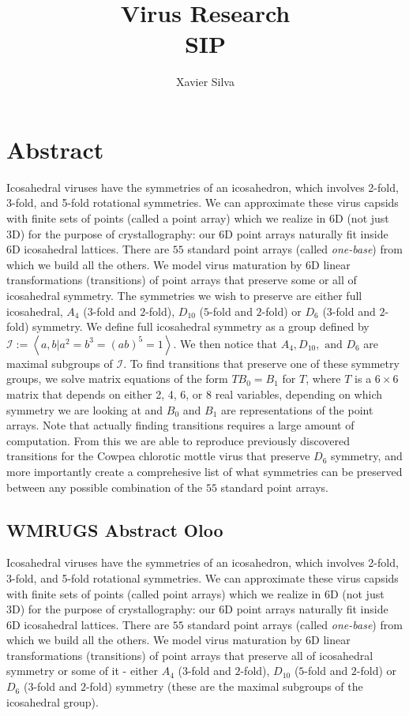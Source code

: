 \documentclass[a4paper,10pt]{article}
\title{Virus Research \\ \large SIP}
\author{Xavier Silva}
\theoremstyle{plain}
\theoremstyle{definition}
\theoremstyle{remark}
\newcommand{\generatedby}[1]{\left\langle#1\right\rangle}
\begin{document}
\maketitle

\tableofcontents


\section{Abstract}

Icosahedral viruses have the symmetries of an icosahedron, which involves 2-fold, 3-fold, and 5-fold rotational symmetries.
We can approximate these virus capsids with finite sets of points (called a point array) which we realize in 6D (not just 3D) for the purpose of crystallography: our 6D point arrays naturally fit inside 6D icosahedral lattices. There are \(55\) standard point arrays (called \emph{one-base}) from which we build all the others.
We model virus maturation by 6D linear transformations (transitions) of point arrays that preserve some or all of icosahedral symmetry.
The symmetries we wish to preserve are either full icosahedral, $A_4$ ($3$-fold and $2$-fold), $D_{10}$ ($5$-fold and $2$-fold) or $D_6$ ($3$-fold and $2$-fold) symmetry.
We define full icosahedral symmetry as a group defined by \(\mathcal{I} := \generatedby{a, b | a^2 = b^3 = (ab)^5 = 1}\).
We then notice that \(A_4, D_{10}, \text{ and } D_6\) are maximal subgroups of \(\mathcal{I}\).
To find transitions that preserve one of these symmetry groups, we solve matrix equations of the form \(TB_0 = B_1\) for \(T\), where \(T\) is a \(6\times6\) matrix that depends on either 2, 4, 6, or 8 real variables, depending on which symmetry we are looking at and \(B_0\) and \(B_1\) are representations of the point arrays.
Note that actually finding transitions requires a large amount of computation.
From this we are able to reproduce previously discovered transitions for the Cowpea chlorotic mottle virus that preserve \(D_6\) symmetry, and more importantly create a comprehesive list of what symmetries can be preserved between any possible combination of the \(55\) standard point arrays.

\subsection{WMRUGS Abstract Oloo}
Icosahedral viruses have the symmetries of an icosahedron, which involves 2-fold, 3-fold, and 5-fold rotational symmetries.
We can approximate these virus capsids with finite sets of points (called point arrays) which we realize in 6D (not just 3D) for the purpose of crystallography: our 6D point arrays naturally fit inside 6D icosahedral lattices. There are \(55\) standard point arrays (called \emph{one-base}) from which we build all the others.
We model virus maturation by 6D linear transformations (transitions) of point arrays that preserve all of  icosahedral symmetry or some of it - either  $A_4$ ($3$-fold and $2$-fold), $D_{10}$ ($5$-fold and $2$-fold) or $D_6$ ($3$-fold and $2$-fold) symmetry (these are the maximal subgroups of the icosahedral group).
\end{document}
